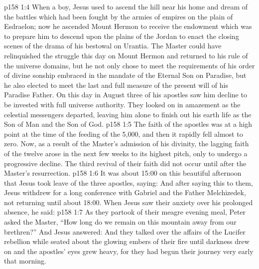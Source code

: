 \vs p158 1:4 When a boy, Jesus used to ascend the hill near his home and dream of the battles which had been fought by the armies of empires on the plain of Esdraelon; now he ascended Mount Hermon to receive the endowment which was to prepare him to descend upon the plains of the Jordan to enact the closing scenes of the drama of his bestowal on Urantia. The Master could have relinquished the struggle this day on Mount Hermon and returned to his rule of the universe domains, but he not only chose to meet the requirements of his order of divine sonship embraced in the mandate of the Eternal Son on Paradise, but he also elected to meet the last and full measure of the present will of his Paradise Father. On this day in August three of his apostles saw him decline to be invested with full universe authority. They looked on in amazement as the celestial messengers departed, leaving him alone to finish out his earth life as the Son of Man and the Son of God.
\vs p158 1:5 The faith of the apostles was at a high point at the time of the feeding of the 5,000, and then it rapidly fell almost to zero. Now, as a result of the Master’s admission of his divinity, the lagging faith of the twelve arose in the next few weeks to its highest pitch, only to undergo a progressive decline. The third revival of their faith did not occur until after the Master’s resurrection.
\vs p158 1:6 It was about 15:00 on this beautiful afternoon that Jesus took leave of the three apostles, saying:  And after saying this to them, Jesus withdrew for a long conference with Gabriel and the Father Melchizedek, not returning until about 18:00. When Jesus saw their anxiety over his prolonged absence, he said: 
\vs p158 1:7 As they partook of their meagre evening meal, Peter asked the Master, “How long do we remain on this mountain away from our brethren?” And Jesus answered:  And they talked over the affairs of the Lucifer rebellion while seated about the glowing embers of their fire until darkness drew on and the apostles’ eyes grew heavy, for they had begun their journey very early that morning.
